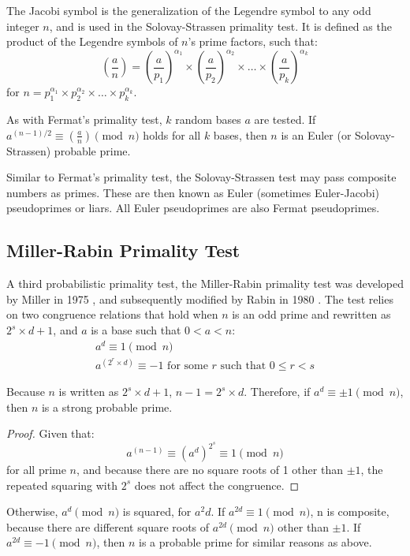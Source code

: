 \documentclass{article}
\begin{document}
The Jacobi symbol is the generalization of the Legendre symbol to any odd integer $n$, and is used in the Solovay-Strassen primality test. It is defined as the product of the Legendre symbols of $n$'s prime factors, such that:
\[
    \left(\frac{a}{n}\right) = \left(\frac{a}{p_1}\right)^{\alpha_{1}} \times \left(\frac{a}{p_2}\right)^{\alpha_{2}} \times \ldots{} \times \left(\frac{a}{p_k}\right)^{\alpha_{k}}
\]
for $n = p_1^{\alpha_{1}} \times p_2^{\alpha_{2}} \times \ldots{} \times p_k^{\alpha_{k}}$.

As with Fermat's primality test, $k$ random bases $a$ are tested. If $a^{(n - 1) / 2} \equiv (\frac{a}{n}) \pmod{n}$ holds for all $k$ bases, then $n$ is an Euler (or Solovay-Strassen) probable prime.

Similar to Fermat's primality test, the Solovay-Strassen test may pass composite numbers as primes. These are then known as Euler (sometimes Euler-Jacobi) pseudoprimes or liars. All Euler pseudoprimes are also Fermat pseudoprimes. 

\subsection{Miller-Rabin Primality Test}
A third probabilistic primality test, the Miller-Rabin primality test was developed by Miller in 1975 \cite{miller_riemanns_1975}, and subsequently modified by Rabin in 1980 \cite{rabin_probabilistic_1980}. The test relies on two congruence relations that hold when $n$ is an odd prime and rewritten as $2^s \times d + 1$, and $a$ is a base such that $0 < a < n$:
\begin{gather*}
    a^d \equiv 1 \pmod{n} \\
    a^{(2^r \times d)} \equiv -1 \text{ for some $r$ such that $0 \leq r < s$}
\end{gather*}

Because $n$ is written as $2^s \times d + 1$, $n - 1 = 2^s \times d$. Therefore, if $a^d \equiv \pm 1 \pmod{n}$, then $n$ is a strong probable prime.

\begin{proof}
    Given that:
    \[
        a^{(n - 1)} \equiv (a^d)^{2^s} \equiv 1 \pmod{n}
    \]
    for all prime $n$, and because there are no square roots of 1 other than $\pm 1$, the repeated squaring with $2^s$ does not affect the congruence.
\end{proof}

Otherwise, $a^d \pmod{n}$ is squared, for $a^2d$. If $a^{2d} \equiv 1 \pmod{n}$, n is composite, because there are different square roots of $a^{2d} \pmod{n}$ other than $\pm 1$. If $a^{2d} \equiv -1 \pmod{n}$, then $n$ is a probable prime for similar reasons as above.
\end{document}
